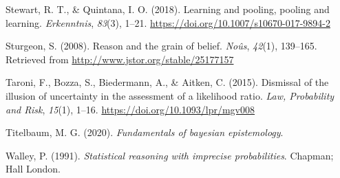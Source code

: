 \documentclass[
  10pt,
  dvipsnames,enabledeprecatedfontcommands]{scrartcl}
\newlength{\cslhangindent}
\newlength{\cslentryspacingunit} %
\newenvironment{CSLReferences}[2] %
 {%
  \setlength{\parindent}{0pt}
  \ifodd #1
  \let\oldpar\par
  \def\par{\hangindent=\cslhangindent\oldpar}
  \fi
  \setlength{\parskip}{#2\cslentryspacingunit}
 }%
 {}
\begin{document}
\begin{CSLReferences}{1}{0}
\leavevmode{}%
Stewart, R. T., \& Quintana, I. O. (2018). Learning and pooling, pooling
and learning. \emph{Erkenntnis}, \emph{83}(3), 1--21.
\url{https://doi.org/10.1007/s10670-017-9894-2}

\leavevmode{}%
Sturgeon, S. (2008). Reason and the grain of belief. \emph{No{û}s},
\emph{42}(1), 139--165. Retrieved from
\url{http://www.jstor.org/stable/25177157}

\leavevmode{}%
Taroni, F., Bozza, S., Biedermann, A., \& Aitken, C. (2015). {Dismissal
of the illusion of uncertainty in the assessment of a likelihood ratio}.
\emph{Law, Probability and Risk}, \emph{15}(1), 1--16.
\url{https://doi.org/10.1093/lpr/mgv008}

\leavevmode{}%
Titelbaum, M. G. (2020). \emph{Fundamentals of bayesian epistemology}.

\leavevmode{}%
Walley, P. (1991). \emph{Statistical reasoning with imprecise
probabilities}. Chapman; Hall London.

\end{CSLReferences}
\end{document}
